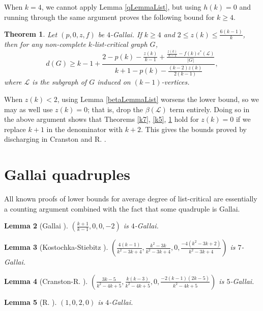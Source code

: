 \documentclass[10pt]{article}
\theoremstyle{plain}
\newtheorem{thm}{Theorem}[section]
\newtheorem{lem}[thm]{Lemma}
\theoremstyle{definition}
\theoremstyle{remark}
\newcommand{\fancy}[1]{\mathcal{#1}}
\renewcommand{\L}{\fancy{L}}
\newcommand{\card}[1]{\left|#1\right|}
\newcommand{\parens}[1]{\left( #1 \right)}
\begin{document}
\noindent When $k=4$, we cannot apply Lemma \ref{qLemmaList}, but using $h(k)=0$ and running through the same argument proves the following bound for $k\ge 4$.
\begin{thm}\label{k4}
	Let $\parens{p,0,z,f}$ be $4$-Gallai.  If $k \ge 4$ and $2 \le z(k) \le \frac{6(k-1)}{k}$, then for any non-complete $k$-list-critical graph $G$,
	\[d(G) \ge k-1 + \frac{2 - p(k) - \frac{z(k)}{k-1} + \frac{\frac{z(k)}{k-1} - f(k)c^*(\L)}{\card{G}}}{k+1 - p(k) - \frac{(k-2)z(k)}{2(k-1)}},\]
	where $\L$ is the subgraph of $G$ induced on $(k-1)$-vertices.
\end{thm}

When $z(k) < 2$, using Lemma \ref{betaLemmaList} worsens the lower bound, so we may as well use $z(k)=0$; that is, drop the $\beta(\L)$ term entirely.  
Doing so in the above argument shows that Theorems \ref{k7}, \ref{k5}, \ref{k4} hold for $z(k) = 0$ if we replace $k+1$ in the denominator with $k+2$.  
This gives the bounds proved by discharging in Cranston and R. \cite{DischargingLowerBound}.

\section{Gallai quadruples}
All known proofs of lower bounds for average degree of list-critical are essentially a counting argument combined with the fact that some quadruple is Gallai.

\begin{lem}[Gallai \cite{gallai1963kritische}]
$\parens{\frac{k+1}{k-1}, 0, 0, -2}$ is $4$-Gallai.
\end{lem}

\begin{lem}[Kostochka-Stiebitz \cite{kostochkastiebitzedgesincriticalgraph}]
$\parens{\frac{4(k-1)}{k^2 - 3k + 4}, \frac{k^2 - 3k}{k^2-3k+4}, 0, \frac{-4(k^2-3k+2)}{k^2-3k+4}}$ is $7$-Gallai.
\end{lem}

\begin{lem}[Cranston-R. \cite{DischargingLowerBound}]
$\parens{\frac{3k-5}{k^2-4k+5}, \frac{k(k-3)}{k^2-4k+5}, 0, \frac{-2(k-1)(2k-5)}{k^2-4k+5}}$ is $5$-Gallai.
\end{lem}

\begin{lem}[R. \cite{Better4ListCriticalBound}]\label{Rbound}
$\parens{1, 0, 2, 0}$ is $4$-Gallai.
\end{lem}
\end{document}
